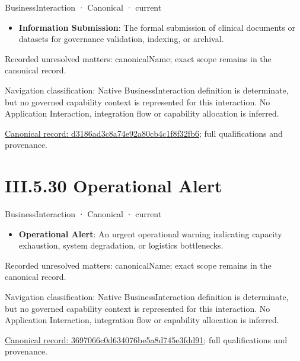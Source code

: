 \label{element:d3186ad3c8a74e92a80cb4c1f8f32fb6}
{\small BusinessInteraction · Canonical · current}\par

\begin{itemize}


\item \textbf{Information Submission}: The formal submission of clinical documents or datasets for governance validation, indexing, or archival.

\end{itemize}

{\small Recorded unresolved matters: canonicalName; exact scope remains in the canonical record.}\par
{\small Navigation classification: Native BusinessInteraction definition is determinate, but no governed capability context is represented for this interaction. No Application Interaction, integration flow or capability allocation is inferred.}\par
{\footnotesize \href{../../../../../../../continuum/business/business-interaction/d3186ad3c8a74e92a80cb4c1f8f32fb6.md}{Canonical record: d3186ad3c8a74e92a80cb4c1f8f32fb6}; full qualifications and provenance.}\par
\section*{III.5.30 Operational Alert}
\label{navigation:III.5.30}

\label{element:3697066c0d634076be5a8d745e3fdd91}
{\small BusinessInteraction · Canonical · current}\par

\begin{itemize}


\item \textbf{Operational Alert}: An urgent operational warning indicating capacity exhaustion, system degradation, or logistics bottlenecks.

\end{itemize}

{\small Recorded unresolved matters: canonicalName; exact scope remains in the canonical record.}\par
{\small Navigation classification: Native BusinessInteraction definition is determinate, but no governed capability context is represented for this interaction. No Application Interaction, integration flow or capability allocation is inferred.}\par
{\footnotesize \href{../../../../../../../continuum/business/business-interaction/3697066c0d634076be5a8d745e3fdd91.md}{Canonical record: 3697066c0d634076be5a8d745e3fdd91}; full qualifications and provenance.}\par
